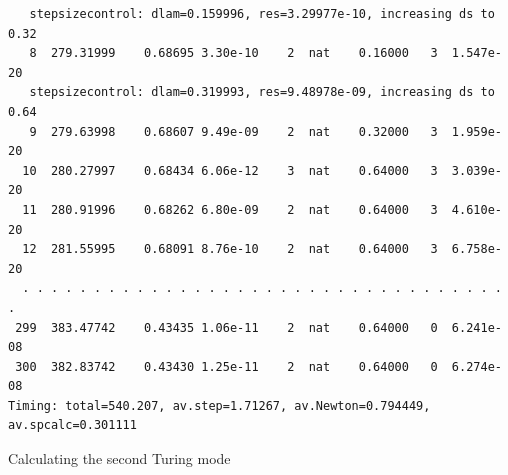 \documentclass[a4paper,12pt]{article}
\begin{document}
\begin{verbatim}
   stepsizecontrol: dlam=0.159996, res=3.29977e-10, increasing ds to 0.32
   8  279.31999    0.68695 3.30e-10    2  nat    0.16000   3  1.547e-20 
   stepsizecontrol: dlam=0.319993, res=9.48978e-09, increasing ds to 0.64
   9  279.63998    0.68607 9.49e-09    2  nat    0.32000   3  1.959e-20 
  10  280.27997    0.68434 6.06e-12    3  nat    0.64000   3  3.039e-20 
  11  280.91996    0.68262 6.80e-09    2  nat    0.64000   3  4.610e-20 
  12  281.55995    0.68091 8.76e-10    2  nat    0.64000   3  6.758e-20 
  . . . . . . . . . . . . . . . . . . . . . . . . . . . . . . . . . . .
 299  383.47742    0.43435 1.06e-11    2  nat    0.64000   0  6.241e-08 
 300  382.83742    0.43430 1.25e-11    2  nat    0.64000   0  6.274e-08 
Timing: total=540.207, av.step=1.71267, av.Newton=0.794449, av.spcalc=0.301111
\end{verbatim}
Calculating the second Turing mode
\end{document}
